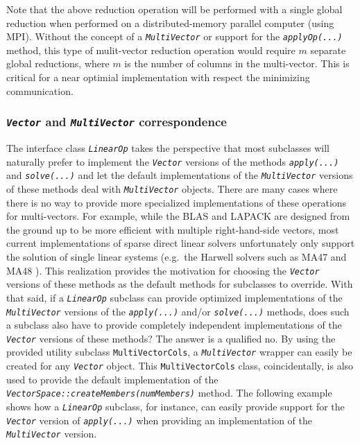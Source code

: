 \documentclass[10pt,fleqn]{article}
\begin{document}
Note that the above reduction operation will be performed with a
single global reduction when performed on a distributed-memory
parallel computer (using MPI).  Without the concept of a
\texttt{\textit{MultiVector}} or support for the
\texttt{\textit{applyOp(...)}} method, this type of mulit-vector
reduction operation would require $m$ separate global reductions,
where $m$ is the number of columns in the multi-vector.  This is
critical for a near optimial implementation with respect the
minimizing communication.

%
\subsubsection{\texttt{\textit{Vector}} and \texttt{\textit{MultiVector}} correspondence}
\label{tsfcore:sec:vector_vs_multivector}
%

The interface class \texttt{\textit{LinearOp}} takes the perspective
that most subclasses will naturally prefer to implement the
\texttt{\textit{Vector}} versions of the methods
\texttt{\textit{apply(...)}} and
\texttt{\textit{solve(...)}} and let the default implementations of the
\texttt{\textit{MultiVector}} versions of these methods deal with
\texttt{\textit{MultiVector}} objects.  There are many cases where there is no
way to provide more specialized implementations of these operations
for multi-vectors.  For example, while the BLAS and LAPACK are
designed from the ground up to be more efficient with multiple
right-hand-side vectors, most current implementations of sparse direct
linear solvers unfortunately only support the solution of single
linear systems (e.g.~the Harwell solvers such as MA47 and MA48
\cite{ref:hsl_1995}).  This realization provides the motivation for
choosing the \texttt{\textit{Vector}} versions of these methods as the
default methods for subclasses to override.  With that said, if a
\texttt{\textit{LinearOp}} subclass can
provide optimized implementations of the \texttt{\textit{MultiVector}}
versions of the \texttt{\textit{apply(...)}} and/or
\texttt{\textit{solve(...)}} methods, does such a subclass
also have to provide completely independent implementations of the
\texttt{\textit{Vector}} versions of these methods?  The answer is a
qualified no.  By using the provided utility subclass
\texttt{MultiVectorCols}, a \texttt{\textit{MultiVector}} wrapper can
easily be created for any \texttt{\textit{Vector}} object.  This
\texttt{MultiVectorCols} class, coincidentally, is also used
to provide the default implementation of the
\texttt{\textit{VectorSpace\-::createMembers(numMembers)}} method.
The following example shows how a
\texttt{\textit{LinearOp}} subclass, for instance, can easily provide
support for the \texttt{\textit{Vector}} version of
\texttt{\textit{apply(...)}} when providing an implementation of the
\texttt{\textit{MultiVector}} version.
\end{document}
